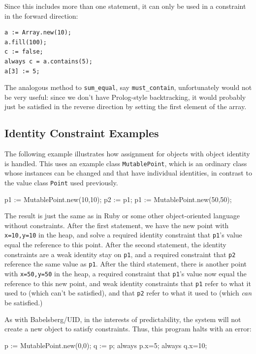 \documentclass{article}
\begin{document}
Since this includes more than one statement, it can only be used in
a constraint in the forward direction:
\begin{verbatim}
a := Array.new(10);
a.fill(100);
c := false;
always c = a.contains(5);
a[3] := 5;
\end{verbatim}

The analogous method to \verb|sum_equal|, say \verb|must_contain|,
unfortunately would not be very useful: since we don't have
Prolog-style backtracking, it would probably just be satisfied in the
reverse direction by setting the first element of the array.

\subsection{Identity Constraint Examples}

The following example illustrates how assignment for objects with
object identity is handled.  This uses an example class
\verb|MutablePoint|, which is an ordinary class whose instances can be
changed and that have individual identities, in contrast to the value
class \verb|Point| used previously.

\begin{example}
p1 := MutablePoint.new(10,10);
p2 := p1;
p1 := MutablePoint.new(50,50);
\end{example}

The result is just the same as in Ruby or some other object-oriented
language without constraints.  After the first statement, we have the
new point with \verb|x=10,y=10| in the heap, and solve a required identity
constraint that \verb|p1|'s value equal the reference to this point.
After the second statement, the identity constraints are a weak
identity stay on \verb|p1|, and a required constraint that \verb|p2|
reference the same value as \verb|p1|.  After the third statement,
there is another point with \verb|x=50,y=50| in the heap, a required
constraint that \verb|p1|'s value now equal the reference to this new
point, and weak identity constraints that \verb|p1| refer to what it
used to (which can't be satisfied), and that \verb|p2| refer to what
it used to (which \emph{can} be satisfied.)

As with Babelsberg/UID, in the interests of predictability, the system
will not create a new object to satisfy constraints.  Thus, this
program halts with an error:
\begin{example}
p := MutablePoint.new(0,0);
q := p;
always p.x=5;
always q.x=10;
\end{example}
\end{document}
